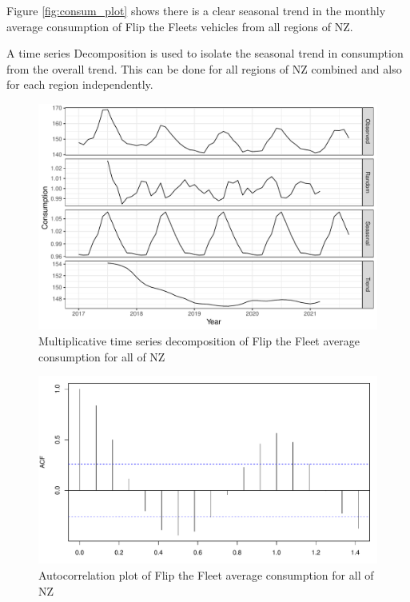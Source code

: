 \documentclass[
]{article}
\begin{document}
Figure \ref{fig:consum_plot} shows there is a clear seasonal trend in
the monthly average consumption of Flip the Fleets vehicles from all
regions of NZ.

A time series Decomposition is used to isolate the seasonal trend in
consumption from the overall trend. This can be done for all regions of
NZ combined and also for each region independently.

\begin{figure}
\centering
\includegraphics{final_report_files/figure-latex/consum_decomp_plot-1.pdf}
\caption{Multiplicative time series decomposition of Flip the Fleet
average consumption for all of NZ\label{fig:consum_decomp_plot}}
\end{figure}

\begin{figure}
\centering
\includegraphics{final_report_files/figure-latex/acf_consum-1.pdf}
\caption{Autocorrelation plot of Flip the Fleet average consumption for
all of NZ\label{fig:acf_consum}}
\end{figure}
\end{document}
